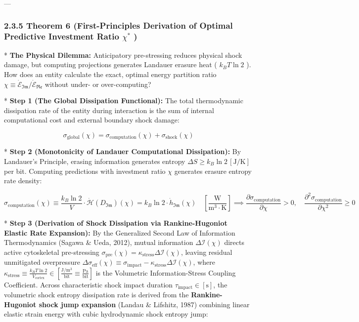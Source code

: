 \documentclass[11pt,a4paper]{article}
\theoremstyle{definition}
\theoremstyle{remark}
\begin{document}
---

\subsubsection{2.3.5 Theorem 6 (First-Principles Derivation of Optimal Predictive Investment Ratio $\chi^*$ )}
* \textbf{The Physical Dilemma:} Anticipatory pre-stressing reduces physical shock damage, but computing projections generates Landauer erasure heat ( $k_B T \ln 2$ ). How does an entity calculate the exact, optimal energy partition ratio $\chi \equiv \dot{\mathcal{E}}_{\mathfrak{Im}} / \dot{\mathcal{E}}_{\mathfrak{Re}}$ without under- or over-computing?

* \textbf{Step 1 (The Global Dissipation Functional):}
The total thermodynamic dissipation rate of the entity during interaction is the sum of internal computational cost and external boundary shock damage:


\begin{equation}
\sigma_{\text{global}}(\chi) = \sigma_{\text{computation}}(\chi) + \sigma_{\text{shock}}(\chi)
\end{equation}


* \textbf{Step 2 (Monotonicity of Landauer Computational Dissipation):}
By Landauer's Principle, erasing information generates entropy $\Delta S \ge k_B \ln 2 \, [\mathrm{J/K}]$ per bit. Computing predictions with investment ratio $\chi$ generates erasure entropy rate density:


\begin{equation}
\sigma_{\text{computation}}(\chi) \equiv \frac{k_B \ln 2}{V} \cdot \dot{\mathcal{H}}(D_{\mathfrak{Im}})(\chi) = k_B \ln 2 \cdot \dot{h}_{\mathfrak{Im}}(\chi) \quad [\frac{\mathrm{W}}{\mathrm{m^3 \cdot K}}] \implies \frac{\partial \sigma_{\text{computation}}}{\partial \chi} > 0, \quad \frac{\partial^2 \sigma_{\text{computation}}}{\partial \chi^2} \ge 0
\end{equation}


* \textbf{Step 3 (Derivation of Shock Dissipation via Rankine-Hugoniot Elastic Rate Expansion):}
By the Generalized Second Law of Information Thermodynamics (Sagawa \& Ueda, 2012), mutual information $\Delta \mathcal{I}(\chi)$ directs active cytoskeletal pre-stressing $\sigma_{\text{pre}}(\chi) = \kappa_{\text{stress}} \Delta \mathcal{I}(\chi)$, leaving residual unmitigated overpressure $\Delta \sigma_{\text{eff}}(\chi) \equiv \sigma_{\text{impact}} - \kappa_{\text{stress}} \Delta \mathcal{I}(\chi)$, where $\kappa_{\text{stress}} \equiv \frac{k_B T \ln 2}{V_{\text{cortex}}} \in [\frac{\mathrm{J/m^3}}{\mathrm{bit}} \equiv \frac{\mathrm{Pa}}{\mathrm{bit}}]$ is the Volumetric Information-Stress Coupling Coefficient. Across characteristic shock impact duration $\tau_{\text{impact}} \in [\mathrm{s}]$, the volumetric shock entropy dissipation rate is derived from the \textbf{Rankine-Hugoniot shock jump expansion} (Landau \& Lifshitz, 1987) combining linear elastic strain energy with cubic hydrodynamic shock entropy jump:
\end{document}
